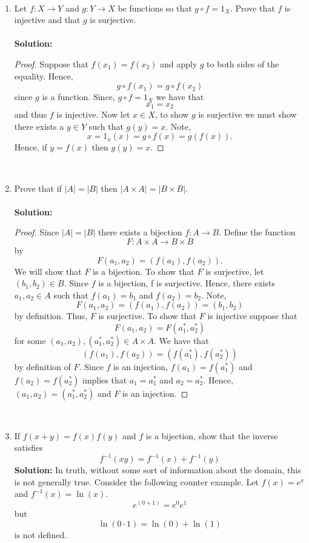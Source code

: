 \documentclass[12pt,letterpaper]{article}
\theoremstyle{plain}
\theoremstyle{definition}
\begin{document}
\ \\
\begin{enumerate}[1.]
\item Let $f:X\rightarrow Y$ and $g:Y\rightarrow X$ be functions so that $g\circ f=1_X$. Prove that $f$ is injective and that $g$ is surjective. \\
\ \\
{\bf Solution:}
\begin{proof}
Suppose that $f(x_1)=f(x_2)$ and apply $g$ to both sides of the equality. Hence, 
\[g\circ f(x_1)=g\circ f(x_2)\] since $g$ is a function. 
Since, $g\circ f=1_X$ we have that 
\[x_1=x_2\] and thus $f$ is injective. 
Now let $x\in X$, to show $g$ is surjective we must show there exists a $y\in Y$ such that $g(y)=x$. Note, 
\[x=1_x(x)=g\circ f(x)=g(f(x)).\]
Hence, if $y=f(x)$ then $g(y)=x$.
\end{proof}
\ \\
\item Prove that if $|A|=|B|$ then $|A\times A|=|B\times B|$. \\
\ \\
{\bf Solution:}
\begin{proof}
Since $|A|=|B|$ there exists a bijection $f:A\rightarrow B$. Define the function \[F:A\times A\rightarrow B\times B\] by 
\[F(a_1,a_2)=(f(a_1), f(a_2)).\]
We will show that $F$ is a bijection. To show that $F$ is surjective, let $(b_1, b_2)\in B$. Since $f$ is a bijection, f is surjective. Hence, there exists $a_1, a_2\in A$ such that $f(a_1)=b_1$ and $f(a_2)=b_2$. Note, 
\[F(a_1, a_2)=(f(a_1), f(a_2))=(b_1, b_2)\] by definition. Thus, $F$ is surjective. To show that $F$ is injective suppose that 
\[F(a_1, a_2)=F(a_1^*, a_2^*) \] for some $(a_1, a_2), (a_1^*, a_2^*)\in A\times A$. 
We have that 
\[(f(a_1), f(a_2))=(f(a_1^*), f(a_2^*))\] by definition of $F$. 
Since $f$ is an injection,  $f(a_1)=f(a_1^*)$ and $f(a_2)= f(a_2^*)$ implies that $a_1=a_1^*$ and $a_2=a_2^*$. Hence, $(a_1, a_2)=(a_1^*, a_2^*)$ and $F$ is an injection. 
\end{proof}
\ \\
\item If $f(x+y)=f(x)f(y)$ and $f$ is a bijection, show that the inverse satisfies 
\[f^{-1}(xy)=f^{-1}(x)+f^{-1}(y)\]      
{\bf Solution:} In truth, without some sort of information about the domain, this is not generally true. 
Consider the following counter example. Let $f(x)=e^x$ and $f^{-1}(x)=\ln(x)$. 
\[e^{(0+1)}=e^0e^1\]
but 
\[\ln(0\cdot 1)=\ln(0)+\ln(1)\]
is not defined.


\end{enumerate}
\end{document}
